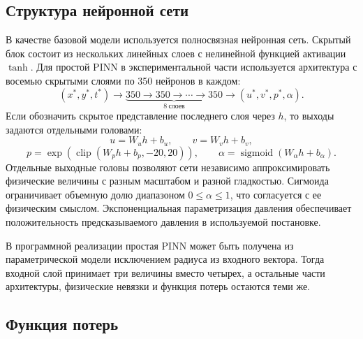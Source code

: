 \subsection{Структура нейронной сети}

В качестве базовой модели используется полносвязная нейронная сеть. Скрытый
блок состоит из нескольких линейных слоев с нелинейной функцией активации
\(\tanh\). Для простой PINN в экспериментальной части используется архитектура
с восемью скрытыми слоями по 350 нейронов в каждом:
\[
    (x^*,y^*,t^*) \rightarrow
    \underbrace{350 \rightarrow 350 \rightarrow \cdots \rightarrow 350}_{8\ \text{слоев}}
    \rightarrow
    (u^*,v^*,p^*,\alpha).
\]
Если обозначить скрытое представление последнего слоя через \(h\), то выходы
задаются отдельными головами:
\[
    u = W_u h + b_u,
    \qquad
    v = W_v h + b_v,
\]
\[
    p = \exp\left(\operatorname{clip}(W_p h+b_p,-20,20)\right),
    \qquad
    \alpha=\operatorname{sigmoid}(W_\alpha h+b_\alpha).
\]
Отдельные выходные головы позволяют сети независимо аппроксимировать физические
величины с разным масштабом и разной гладкостью. Сигмоида ограничивает
объемную долю диапазоном \(0\leq\alpha\leq1\), что согласуется с ее физическим
смыслом. Экспоненциальная параметризация давления обеспечивает положительность
предсказываемого давления в используемой постановке.

В программной реализации простая PINN может быть получена из параметрической
модели исключением радиуса из входного вектора. Тогда входной слой принимает
три величины вместо четырех, а остальные части архитектуры, физические невязки
и функция потерь остаются теми же.

\subsection{Функция потерь}

